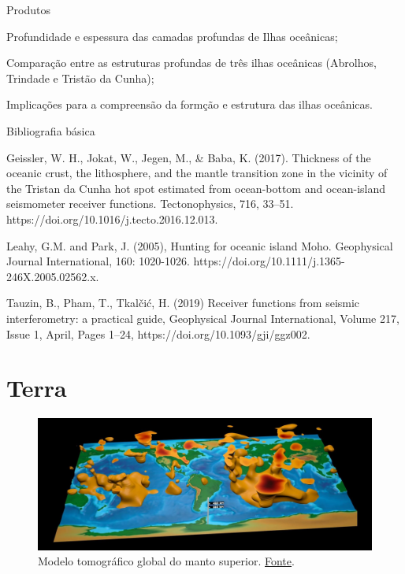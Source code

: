 \documentclass[10pt,a4paper,oneside]{book}
\newcommand{\HeroFigPad}{\vspace{-1cm}}
\begin{document}
\begin{fancyenum}{\faShoppingCart}{Produtos}
	\item Profundidade e espessura das camadas profundas de Ilhas oceânicas;
	\item Comparação entre as estruturas profundas de três ilhas oceânicas (Abrolhos, Trindade e Tristão da Cunha);	
	\item Implicações para a compreensão da formção e estrutura das ilhas oceânicas.
\end{fancyenum}

\begin{fancyenum}{\faBook}{Bibliografia básica}
	\item Geissler, W. H., Jokat, W., Jegen, M., \& Baba, K. (2017). Thickness of the oceanic crust, the lithosphere, and the mantle transition zone in the vicinity of the Tristan da Cunha hot spot estimated from ocean-bottom and ocean-island seismometer receiver functions. Tectonophysics, 716, 33–51. https://doi.org/10.1016/j.tecto.2016.12.013.
	\item Leahy, G.M. and Park, J. (2005), Hunting for oceanic island Moho. Geophysical Journal International, 160: 1020-1026. https://doi.org/10.1111/j.1365-246X.2005.02562.x.
	\item Tauzin, B., Pham, T., Tkalčić, H. (2019) Receiver functions from seismic interferometry: a practical guide, Geophysical Journal International, Volume 217, Issue 1, April, Pages 1–24, https://doi.org/10.1093/gji/ggz002.
\end{fancyenum}

\chapter{Terra}
\label{cap_terra}

\begin{figure}[h]
	\HeroFigPad
	\begin{center}
		\includegraphics[width=\textwidth]{images/globe_structure.jpg}
	\end{center}
	\caption{
	Modelo tomográfico global do manto superior. \href{https://www.olcf.ornl.gov/2017/03/28/a-seismic-mapping-milestone/}{Fonte}.
    }
 \label{fig_structure}
\end{figure}
\end{document}

